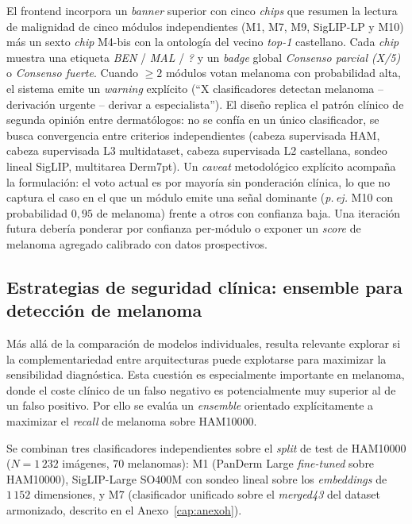 El frontend incorpora un \emph{banner} superior con cinco
\emph{chips} que resumen la lectura de malignidad de cinco
módulos independientes (M1, M7, M9, SigLIP-LP y M10) más un sexto
\emph{chip} M4-bis con la ontología del vecino \emph{top-1}
castellano. Cada \emph{chip} muestra una etiqueta \emph{BEN}
/ \emph{MAL} / \emph{?} y un \emph{badge} global \emph{Consenso
parcial (X/5)} o \emph{Consenso fuerte}. Cuando $\geq 2$
módulos votan melanoma con probabilidad alta, el sistema emite
un \emph{warning} explícito (``X clasificadores detectan
melanoma -- derivación urgente -- derivar a especialista''). El
diseño replica el patrón clínico de segunda opinión entre
dermatólogos: no se confía en un único clasificador, se busca
convergencia entre criterios independientes (cabeza supervisada
HAM, cabeza supervisada L3 multidataset, cabeza supervisada L2
castellana, sondeo lineal SigLIP, multitarea Derm7pt). Un
\emph{caveat} metodológico explícito acompaña la formulación: el
voto actual es por mayoría sin ponderación clínica, lo que no
captura el caso en el que un módulo emite una señal dominante
(\emph{p.\,ej.} M10 con probabilidad $0{,}95$ de melanoma) frente
a otros con confianza baja. Una iteración futura debería
ponderar por confianza per-módulo o exponer un \emph{score} de
melanoma agregado calibrado con datos prospectivos.

\subsection{Estrategias de seguridad clínica: ensemble para detección de melanoma}
\label{sec:ensemble-results}

Más allá de la comparación de modelos individuales, resulta
relevante explorar si la complementariedad entre arquitecturas puede
explotarse para maximizar la sensibilidad diagnóstica. Esta cuestión
es especialmente importante en melanoma, donde el coste clínico de
un falso negativo es potencialmente muy superior al de un falso
positivo. Por ello se evalúa un \emph{ensemble} orientado
explícitamente a maximizar el \emph{recall} de melanoma sobre
HAM10000.

Se combinan tres clasificadores independientes sobre el
\emph{split} de test de HAM10000 ($N = 1\,232$ imágenes,
$70$ melanomas):
M1 (PanDerm Large \emph{fine-tuned} sobre HAM10000), SigLIP-Large
SO400M con sondeo lineal sobre los \emph{embeddings} de
$1\,152$ dimensiones, y M7 (clasificador unificado sobre el
\emph{merged43} del dataset armonizado, descrito en el
Anexo~\ref{cap:anexoh}).

